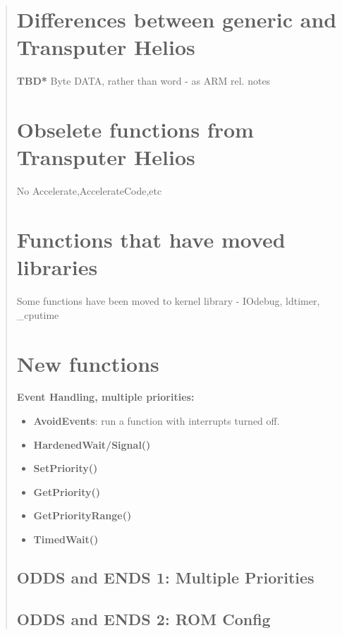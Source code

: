 \begin {quote}
\section{Differences between generic and Transputer Helios}
{\bf *TBD*}
Byte DATA, rather than word - as ARM rel. notes

\section{Obselete functions from Transputer Helios}

No Accelerate,AccelerateCode,etc
\section{Functions that have moved libraries}

Some functions have been moved to kernel library - IOdebug, ldtimer, \_cputime

\section{New functions}

{\bf Event Handling, multiple priorities:}
\begin{itemize}
\item {\bf AvoidEvents}: run a function with interrupts turned off.

\item {\bf HardenedWait/Signal()}

\item {\bf SetPriority()}

\item {\bf GetPriority()}

\item {\bf GetPriorityRange()}

\item {\bf TimedWait()}
\end{itemize}
\vfill
\newpage


\subsection*{ODDS and ENDS 1: Multiple Priorities}



\subsection*{ODDS and ENDS 2: ROM Config}




\end{quote}
